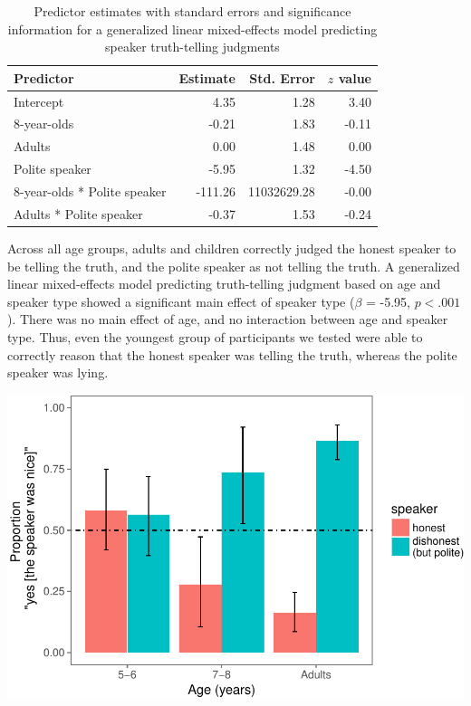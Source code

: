 \documentclass[a4paper,man,apacite,floatsintext]{apa6}
\newenvironment{CodeChunk}{}{}
\begin{document}
\begin{table}[h]
\centering
\begin{tabular}{lrrr}
 Predictor & Estimate & Std. Error & $z$ value \\ 
  \hline
Intercept & 4.35 & 1.28 & 3.40 \\ 
  8-year-olds & -0.21 & 1.83 & -0.11 \\ 
  Adults & 0.00 & 1.48 & 0.00 \\ 
  Polite speaker & -5.95 & 1.32 & -4.50 \\ 
  8-year-olds * Polite speaker & -111.26 & 11032629.28 & -0.00 \\ 
  Adults * Polite speaker & -0.37 & 1.53 & -0.24 \\ 
   \hline
\end{tabular}
\caption{Predictor estimates with standard errors and significance information for a generalized linear mixed-effects model predicting speaker truth-telling judgments} 
\label{tab:nice_tab}
\end{table}

Across all age groups, adults and children correctly judged the honest
speaker to be telling the truth, and the polite speaker as not telling
the truth. A generalized linear mixed-effects model predicting
truth-telling judgment based on age and speaker type showed a
significant main effect of speaker type (\(\beta\) = -5.95,
\(p <.001\)). There was no main effect of age, and no interaction
between age and speaker type. Thus, even the youngest group of
participants we tested were able to correctly reason that the honest
speaker was telling the truth, whereas the polite speaker was lying.

\begin{CodeChunk}

\includegraphics{figs/unnamed-chunk-2-1} \end{CodeChunk}
\end{document}
